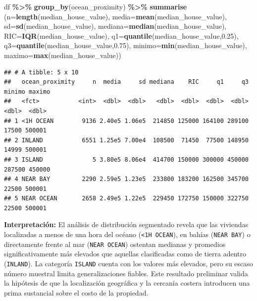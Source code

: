 \documentclass[
]{book}
\newenvironment{Shaded}{\begin{snugshade}}{\end{snugshade}}
\newcommand{\AttributeTok}[1]{\textcolor[rgb]{0.13,0.29,0.53}{#1}}
\newcommand{\FloatTok}[1]{\textcolor[rgb]{0.00,0.00,0.81}{#1}}
\newcommand{\FunctionTok}[1]{\textcolor[rgb]{0.13,0.29,0.53}{\textbf{#1}}}
\newcommand{\NormalTok}[1]{#1}
\newcommand{\SpecialCharTok}[1]{\textcolor[rgb]{0.81,0.36,0.00}{\textbf{#1}}}
\begin{document}
\begin{Shaded}
\begin{Highlighting}[]
\NormalTok{df }\SpecialCharTok{\%\textgreater{}\%} 
  \FunctionTok{group\_by}\NormalTok{(ocean\_proximity) }\SpecialCharTok{\%\textgreater{}\%}
  \FunctionTok{summarise}\NormalTok{ (}\AttributeTok{n=}\FunctionTok{length}\NormalTok{(median\_house\_value),}
             \AttributeTok{media=}\FunctionTok{mean}\NormalTok{(median\_house\_value),}
             \AttributeTok{sd=}\FunctionTok{sd}\NormalTok{(median\_house\_value),}
             \AttributeTok{mediana=}\FunctionTok{median}\NormalTok{(median\_house\_value),}
             \AttributeTok{RIC=}\FunctionTok{IQR}\NormalTok{(median\_house\_value),}
             \AttributeTok{q1=}\FunctionTok{quantile}\NormalTok{(median\_house\_value,}\FloatTok{0.25}\NormalTok{),}
             \AttributeTok{q3=}\FunctionTok{quantile}\NormalTok{(median\_house\_value,}\FloatTok{0.75}\NormalTok{),}
             \AttributeTok{minimo=}\FunctionTok{min}\NormalTok{(median\_house\_value),}
             \AttributeTok{maximo=}\FunctionTok{max}\NormalTok{(median\_house\_value)) }
\end{Highlighting}
\end{Shaded}

\begin{verbatim}
## # A tibble: 5 x 10
##   ocean_proximity     n  media     sd mediana    RIC     q1     q3 minimo maximo
##   <fct>           <int>  <dbl>  <dbl>   <dbl>  <dbl>  <dbl>  <dbl>  <dbl>  <dbl>
## 1 <1H OCEAN        9136 2.40e5 1.06e5  214850 125000 164100 289100  17500 500001
## 2 INLAND           6551 1.25e5 7.00e4  108500  71450  77500 148950  14999 500001
## 3 ISLAND              5 3.80e5 8.06e4  414700 150000 300000 450000 287500 450000
## 4 NEAR BAY         2290 2.59e5 1.23e5  233800 183200 162500 345700  22500 500001
## 5 NEAR OCEAN       2658 2.49e5 1.22e5  229450 172750 150000 322750  22500 500001
\end{verbatim}

\textbf{Interpretación:}
El análisis de distribución segmentado revela que las viviendas localizadas a menos de una hora del océano (\texttt{\textless{}1H\ OCEAN}), en bahías (\texttt{NEAR\ BAY}) o directamente frente al mar (\texttt{NEAR\ OCEAN}) ostentan medianas y promedios significativamente más elevados que aquellas clasificadas como de tierra adentro (\texttt{INLAND}). La categoría \texttt{ISLAND} cuenta con los valores más elevados, pero su escaso número muestral limita generalizaciones fiables. Este resultado preliminar valida la hipótesis de que la localización geográfica y la cercanía costera introducen una prima sustancial sobre el costo de la propiedad.
\end{document}
